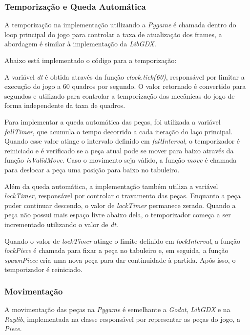 \subsubsection{Temporização e Queda Automática}

A temporização na implementação utilizando a \textit{Pygame} é chamada dentro do loop principal do jogo para controlar a taxa de atualização dos frames, a abordagem é similar à implementação da \textit{LibGDX}.

Abaixo está implementado o código para a temporização:


A variável \textit{dt} é obtida através da função \textit{clock.tick(60)}, responsável por limitar a execução do jogo a 60 quadros por segundo. O valor retornado é convertido para segundos e utilizado para controlar a temporização das mecânicas do jogo de forma independente da taxa de quadros.

Para implementar a queda automática das peças, foi utilizada a variável \textit{fallTimer}, que acumula o tempo decorrido a cada iteração do laço principal. Quando esse valor atinge o intervalo definido em \textit{fallInterval}, o temporizador é reiniciado e é verificado se a peça atual pode se mover para baixo através da função \textit{isValidMove}. Caso o movimento seja válido, a função \textit{move} é chamada para deslocar a peça uma posição para baixo no tabuleiro.

Além da queda automática, a implementação também utiliza a variável \textit{lockTimer}, responsável por controlar o travamento das peças. Enquanto a peça puder continuar descendo, o valor de \textit{lockTimer} permanece zerado. Quando a peça não possui mais espaço livre abaixo dela, o temporizador começa a ser incrementado utilizando o valor de \textit{dt}.

Quando o valor de \textit{lockTimer} atinge o limite definido em \textit{lockInterval}, a função \textit{lockPiece} é chamada para fixar a peça no tabuleiro e, em seguida, a função \textit{spawnPiece} cria uma nova peça para dar continuidade à partida. Após isso, o temporizador é reiniciado.

\subsubsection{Movimentação}

A movimentação das peças na \textit{Pygame} é semelhante a \textit{Godot}, \textit{LibGDX} e na \textit{Raylib}, implementada na classe responsável por representar as peças do jogo, a \textit{Piece}. 

